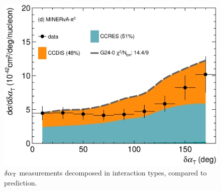 \begin{figure}
    \includegraphics[width=\dbfigwid\textwidth]{figures/0000-min_pi0_dalphat_reac_decomp.eps}
    \caption{$\delta\alpha_\textrm{T}$ measurements decomposed in interaction types, compared to \gZero prediction.}   \label{fig:g24-0-dat-reac} 
    		

\end{figure}
